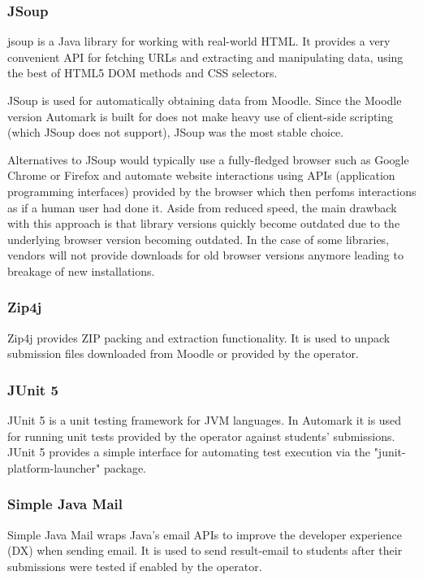 \documentclass[12pt,a4paper,oneside]{report}
\newcommand{\BlockCite}[2]{
	\begin{addmargin}[1cm]{0pt}
		#1

		\fullcite{#2}
	\end{addmargin}
}
\begin{document}
	\subsubsection{JSoup} \label{subsubsec:jsoup}
	\BlockCite{jsoup is a Java library for working with real-world HTML. It provides a very convenient API for fetching URLs and extracting and manipulating data, using the best of HTML5 DOM methods and CSS selectors.}{jsoupwebsite}

	JSoup is used for automatically obtaining data from Moodle. Since the Moodle version Automark is built for does not make heavy use of client-side scripting (which JSoup does not support), JSoup was the most stable choice.

	Alternatives to JSoup would typically use a fully-fledged browser such as Google Chrome or Firefox and automate website interactions using APIs (application programming interfaces) provided by the browser which then perfoms interactions as if a human user had done it. Aside from reduced speed, the main drawback with this approach is that library versions quickly become outdated due to the underlying browser version becoming outdated. In the case of some libraries, vendors will not provide downloads for old browser versions anymore leading to breakage of new installations.

	\subsubsection{Zip4j} \label{subsubsec:zip4j}
	Zip4j provides ZIP packing and extraction functionality.\parencite{zip4jwebsite} It is used to unpack submission files downloaded from Moodle or provided by the operator.

	\subsubsection{JUnit 5} \label{subsubsec:junit5}
	JUnit 5 is a unit testing framework for JVM languages.\parencite{junit5website} In Automark it is used for running unit tests provided by the operator against students' submissions. JUnit 5 provides a simple interface for automating test execution via the "junit-platform-launcher" package\parencite{junitplatformlauncherdocs}.

	\subsubsection{Simple Java Mail}
	Simple Java Mail wraps Java's email APIs to improve the developer experience (DX) when sending email\parencite{simplejavamailwebsite}. It is used to send result-email to students after their submissions were tested if enabled by the operator.
\end{document}
